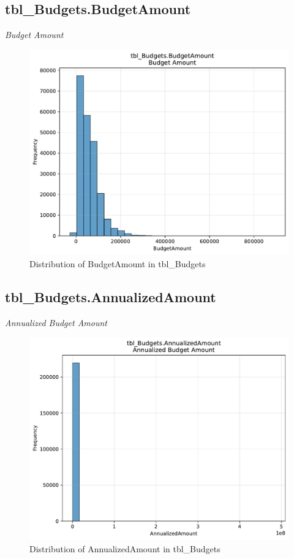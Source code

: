 \subsection{tbl\_Budgets.BudgetAmount}
\textit{Budget Amount}

\begin{figure}[htbp]
\centering
\includegraphics[width=\textwidth]{figures/dbo_tbl_Budgets_BudgetAmount.pdf}
\caption{Distribution of BudgetAmount in tbl\_Budgets}
\end{figure}\newpage

\subsection{tbl\_Budgets.AnnualizedAmount}
\textit{Annualized Budget Amount}

\begin{figure}[htbp]
\centering
\includegraphics[width=\textwidth]{figures/dbo_tbl_Budgets_AnnualizedAmount.pdf}
\caption{Distribution of AnnualizedAmount in tbl\_Budgets}
\end{figure}\newpage

